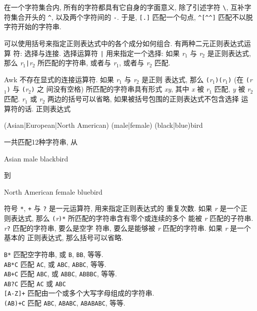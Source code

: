 在一个字符集合内, 所有的字符都具有它自身的字面意义, 除了引述字符 \verb'\',
互补字符集合开头的 \verb'^', 以及两个字符间的 \verb'-'.
于是, \verb'[.]' 匹配一个句点, \verb'^[^^]' 匹配不以脱字符开始的字符串.

可以使用括号来指定正则表达式中的各个成分如何组合. 有两种二元正则表达式运算
符: 选择与连接. 选择运算符 \verb'|' 用来指定一个选择: 如果 \textit{r}$_1$
与 \textit{r}$_2$ 是正则表达式, 那么 \textit{r}$_1$\verb'|'\textit{r}$_2$
所匹配的字符串, 或者与 \textit{r}$_1$, 或者与 \textit{r}$_2$ 匹配.

Awk 不存在显式的连接运算符. 如果 \textit{r}$_1$ 与 \textit{r}$_2$ 是正则
表达式, 那么 \verb'('\textit{r}$_1$\verb')'\verb'('\textit{r}$_1$\verb')'
(在 \verb'('\textit{r}$_1$\verb')' 与 \verb'('\textit{r}$_2$\verb')' 之
间没有空格) 所匹配的字符串具有形式 \textit{xy}, 其中 \textit{x} 被
\textit{r}$_1$ 匹配, \textit{y} 被 \textit{r}$_2$ 匹配. \textit{r}$_1$ 或
\textit{r}$_2$ 两边的括号可以省略, 如果被括号包围的正则表达式不包含选择
运算符的话. 正则表达式
\begin{awkcode}
    (Asian|European|North American) (male|female) (black|blue)bird
\end{awkcode}
一共匹配12种字符串, 从
\begin{file}
    Asian male blackbird
\end{file}
到
\begin{file}
    North American female bluebird
\end{file}

符号 \verb'*', \verb'+' 与 \verb'?' 是一元运算符, 用来指定正则表达式的
重复次数. 如果 \textit{r} 是一个正则表达式, 那么
\verb'('\textit{r}\verb')'\verb'*' 所匹配的字符串含有零个或连续的多个
能被 \textit{r} 匹配的子符串. \textit{r}\verb'?' 匹配的字符串, 要么是空字
符串, 要么是能够被 \textit{r} 匹配的字符串. 如果 \textit{r} 是一个基本的
正则表达式, 那么括号可以省略.
\begin{tabbing}
    \verb'B*' \hspace{4em} \= 匹配空字符串, 或 \verb'B', \verb'BB', 等等.\\
    \verb'AB*C' \> 匹配 \verb'AC', 或 \verb'ABC', \verb'ABBC', 等等. \\
    \verb'AB+C' \> 匹配 \verb'ABC', 或 \verb'ABBC', \verb'ABBBC', 等等.\\
    \verb'AB?C' \> 匹配 \verb'AC' 或 \verb'ABC' \\
    \verb'[A-Z]+' \> 匹配由一个或多个大写字母组成的字符串. \\
    \verb'(AB)+C' \> 匹配 \verb'ABC', \verb'ABABC', \verb'ABABABC', 等等.
\end{tabbing}

